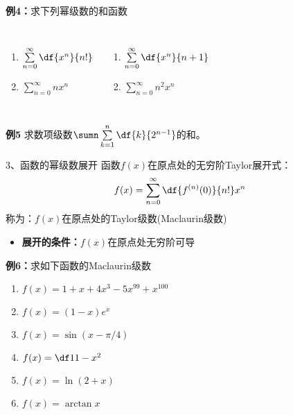 \begin{frame}
	\linespread{1.2}
	\begin{exampleblock}{{\bf 例4：}求下列幂级数的和函数\hfill}
		\begin{columns}
				\begin{enumerate}
				  \item $\sum\limits_{n=0}^{\infty}\df{x^n}{n!}$
				  \item $\sum\limits_{n=0}^{\infty}nx^n$
				\end{enumerate}
				\begin{enumerate}
				  \addtocounter{enumi}{2}
				  \item $\sum\limits_{n=0}^{\infty}\df{x^n}{n+1}$
				  \item $\sum\limits_{n=0}^{\infty}n^2x^n$
				\end{enumerate}
		\end{columns}
	\end{exampleblock}
	\pause\bigskip
	\begin{exampleblock}{{\bf 例5}\hfill}
		求数项级数$\sumn\sum\limits_{k=1}^n\df{k}{2^{n-1}}$的和。
	\end{exampleblock}
\end{frame}

\begin{frame}{3、函数的幂级数展开}
	\linespread{1.2}
	函数$f(x)$在原点处的无穷阶Taylor展开式：\pause 
	$$f(x)=\sum\limits_{n=0}^{\infty}\df{f^{(n)}(0)}{n!}x^n$$
	\pause 称为：{\bb $f(x)$在原点处的Taylor级数(Maclaurin级数)}\pause 
	\begin{itemize}
	  \item \alert{{\bf 展开的条件：}\pause $f(x)$在原点处无穷阶可导}
	\end{itemize}
\end{frame}

\begin{frame}
	\linespread{1.5}
	\begin{exampleblock}{{\bf 例6：}求如下函数的Maclaurin级数\hfill}\pause 
		\begin{enumerate}
		  \item $f(x)=1+x+4x^3-5x^{99}+x^{100}$\pause 
		  \item $f(x)=(1-x)e^x$\pause 
		  \item $f(x)=\sin(x-\pi/4)$\pause 
		  \item $f(x)=\df 1{1-x^2}$\pause 
		  \item $f(x)=\ln(2+x)$\pause 
		  \item $f(x)=\arctan x$
		\end{enumerate}
	\end{exampleblock}
\end{frame}

